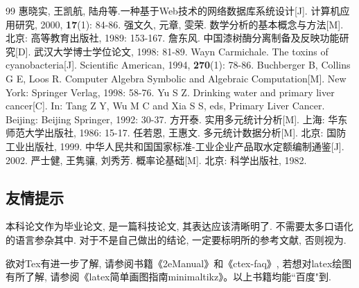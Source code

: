 \documentclass[a4paper,12pt,twoside]{ctexart}
\begin{document}
    \vspace*{-25pt}

    \begin{thebibliography}{99}\setlength{\itemsep}{-.75ex}
     惠晓实, 王凯航, 陆舟等.一种基于Web技术的网络数据库系统设计[J]. 计算机应用研究, 2000, \textbf{17}(1): 84-86.
    强文久, 元章, 雯荣. 数学分析的基本概念与方法[M]. 北京: 高等教育出版社, 1989: 153-167.
    詹东风. 中国漆树酶分离制备及反映功能研究[D]. 武汉大学博士学位论文, 1998: 81-89.
     Wayn Carmichale. The toxins of cyanobacteria[J]. Scientific American, 1994, \textbf{270}(1): 78-86.
    Buchberger B, Collins G E, Loos R. Computer Algebra Symbolic and Algebraic Computation[M]. New York: Springer Verlag, 1998: 58-76.
    Yu S Z. Drinking water and primary liver cancer[C]. In: Tang Z Y, Wu M C and Xia S S, eds, Primary Liver Cancer. Beijing: Beijing Springer, 1992: 30-37.
    方开泰. 实用多元统计分析[M]. 上海: 华东师范大学出版社, 1986: 15-17.
     任若恩, 王惠文. 多元统计数据分析[M]. 北京: 国防工业出版社, 1999.
     中华人民共和国国家标准-工业企业产品取水定额编制通鉴[J]. 2002.
    严士健, 王隽骧, 刘秀芳. 概率论基础[M]. 北京: 科学出版社, 1982.
    \end{thebibliography}

    \subsection{友情提示}
    本科论文作为毕业论文, 是一篇科技论文, 其表达应该清晰明了. 不需要太多口语化的语言参杂其中. 对于不是自己做出的结论, 一定要标明所的参考文献, 否则视为.

    欲对Tex{}有进一步了解, 请参阅书籍《2eManual》和《ctex-faq》, 若想对latex绘图有所了解, 请参阅《latex简单画图指南minimaltikz》。以上书籍均能``百度"到.
\end{document}
